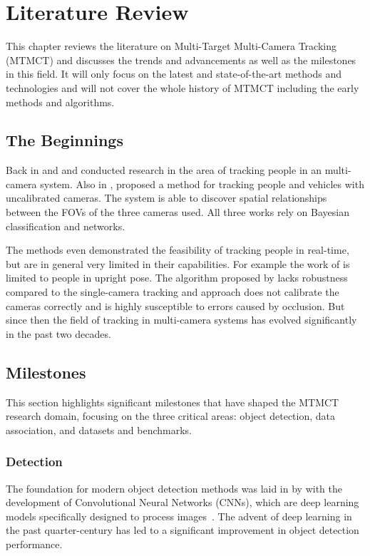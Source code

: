 \chapter{Literature Review}\label{chap:literature_review}
This chapter reviews the literature on Multi-Target Multi-Camera Tracking (MTMCT) and discusses the trends and advancements as well as the milestones in this field. It will only focus on the latest and state-of-the-art methods and technologies and will not cover the whole history of MTMCT including the early methods and algorithms.

\section{The Beginnings}\label{sec:the_beginnings}
Back in \citeyear{Cai99} and \citeyear{Chang01} \textcite{Cai99} and \textcite{Chang01} conducted research in the area of tracking people in an multi-camera system. Also in \citeyear{Khan01}, \textcite{Khan01} proposed a method for tracking people and vehicles with uncalibrated cameras. The system is able to discover spatial relationships between the FOVs of the three cameras used. All three works rely on Bayesian classification and networks. %

The methods even demonstrated the feasibility of tracking people in real-time, but are in general very limited in their capabilities. For example the work of \citeauthor{Chang01} is limited to people in upright pose. The algorithm proposed by \citeauthor{Cai99} lacks robustness compared to the single-camera tracking and \citeauthor{Khan01} approach does not calibrate the cameras correctly and is highly susceptible to errors caused by occlusion. But since then the field of tracking in multi-camera systems has evolved significantly in the past two decades.

\section{Milestones}\label{sec:milestones}
This section highlights significant milestones that have shaped the MTMCT research domain, focusing on the three critical areas: object detection, data association, and datasets and benchmarks.

\subsection{Detection}\label{subsec:milestone_detection}
The foundation for modern object detection methods was laid in \citeyear{Lecun98} by \citeauthor{Lecun98} with the development of Convolutional Neural Networks (CNNs), which are deep learning models specifically designed to process images~\cite{Lecun98}. The advent of deep learning in the past quarter-century has led to a significant improvement in object detection performance.

